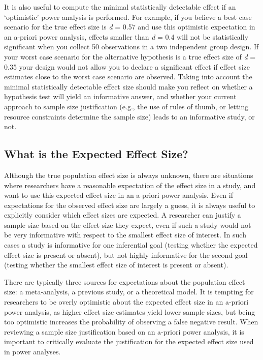 \documentclass[
  english,
  ,jou, a4paper,floatsintext]{apa6}
\begin{document}
It is also useful to compute the minimal statistically detectable effect if an `optimistic' power analysis is performed. For example, if you believe a best case scenario for the true effect size is \emph{d} = 0.57 and use this optimistic expectation in an a-priori power analysis, effects smaller than \emph{d} = 0.4 will not be statistically significant when you collect 50 observations in a two independent group design. If your worst case scenario for the alternative hypothesis is a true effect size of \emph{d} = 0.35 your design would not allow you to declare a significant effect if effect size estimates close to the worst case scenario are observed. Taking into account the minimal statistically detectable effect size should make you reflect on whether a hypothesis test will yield an informative answer, and whether your current approach to sample size justification (e.g., the use of rules of thumb, or letting resource constraints determine the sample size) leads to an informative study, or not.

\hypertarget{what-is-the-expected-effect-size}{%
\subsection{What is the Expected Effect Size?}\label{what-is-the-expected-effect-size}}

Although the true population effect size is always unknown, there are situations where researchers have a reasonable expectation of the effect size in a study, and want to use this expected effect size in an a-priori power analysis. Even if expectations for the observed effect size are largely a guess, it is always useful to explicitly consider which effect sizes are expected. A researcher can justify a sample size based on the effect size they expect, even if such a study would not be very informative with respect to the smallest effect size of interest. In such cases a study is informative for one inferential goal (testing whether the expected effect size is present or absent), but not highly informative for the second goal (testing whether the smallest effect size of interest is present or absent).

There are typically three sources for expectations about the population effect size: a meta-analysis, a previous study, or a theoretical model. It is tempting for researchers to be overly optimistic about the expected effect size in an a-priori power analysis, as higher effect size estimates yield lower sample sizes, but being too optimistic increases the probability of observing a false negative result. When reviewing a sample size justification based on an a-priori power analysis, it is important to critically evaluate the justification for the expected effect size used in power analyses.
\end{document}
